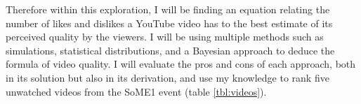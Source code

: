 \documentclass[a4paper,11pt]{article}
\begin{document}

Therefore within this exploration, I will be finding an equation relating the number of likes and dislikes a YouTube video has to the best estimate of its perceived quality by the viewers. I will be using multiple methods such as simulations, statistical distributions, and a Bayesian approach to deduce the formula of video quality. I will evaluate the pros and cons of each approach, both in its solution but also in its derivation, and use my knowledge to rank five unwatched videos from the SoME1 event (table \ref{tbl:videos}).





\end{document}
